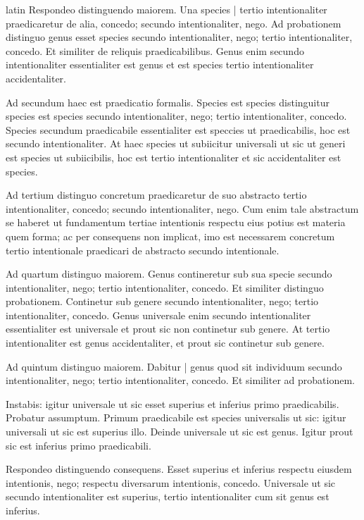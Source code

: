 \begin{otherlanguage*}{latin}
\pstart
Respondeo distinguendo maiorem. Una species \textnormal{|} tertio intentionaliter praedicaretur de alia, concedo; secundo intentionaliter, nego. Ad probationem distinguo genus esset species secundo intentionaliter, nego; tertio intentionaliter, concedo. Et similiter de reliquis praedicabilibus. Genus enim secundo intentionaliter essentialiter est genus et est species tertio intentionaliter accidentaliter. 
\pend

\pstart
Ad secundum haec est praedicatio formalis. Species est species distinguitur species est species secundo intentionaliter, nego; tertio intentionaliter, concedo. Species secundum praedicabile essentialiter est speccies ut praedicabilis, hoc est secundo intentionaliter. At haec species ut subiicitur universali ut sic ut generi est species ut subiicibilis, hoc est tertio intentionaliter et sic accidentaliter est species. 
\pend

\pstart
Ad tertium distinguo concretum praedicaretur de suo abstracto tertio intentionaliter, concedo; secundo intentionaliter, nego. Cum enim tale abstractum se haberet ut fundamentum tertiae intentionis respectu eius potius est materia quem forma; ac per consequens non implicat, imo est necessarem concretum tertio intentionale praedicari de abstracto secundo intentionale. 
\pend

\pstart
Ad quartum distinguo maiorem. Genus contineretur sub sua specie secundo intentionaliter, nego; tertio intentionaliter, concedo. Et similiter distinguo probationem. Continetur sub genere secundo intentionaliter, nego; tertio intentionaliter, concedo. Genus universale enim secundo intentionaliter essentialiter est universale et prout sic non continetur sub genere. At tertio intentionaliter est genus accidentaliter, et prout sic continetur sub genere. 
\pend

\pstart
Ad quintum distinguo maiorem. Dabitur \textnormal{|} genus quod sit individuum secundo intentionaliter, nego; tertio intentionaliter, concedo. Et similiter ad probationem. 
\pend

\pstart
Instabis:
igitur universale ut sic esset superius et inferius primo praedicabilis. Probatur assumptum. Primum praedicabile est species universalis ut sic:
igitur universali ut sic est superius illo. Deinde universale ut sic est genus. Igitur prout sic est inferius primo praedicabili. 
\pend

\pstart
Respondeo distinguendo consequens. Esset superius et inferius respectu eiusdem intentionis, nego; respectu diversarum intentionis, concedo. Universale ut sic secundo intentionaliter est superius, tertio intentionaliter cum sit genus est inferius. 
\pend


\end{otherlanguage*}
